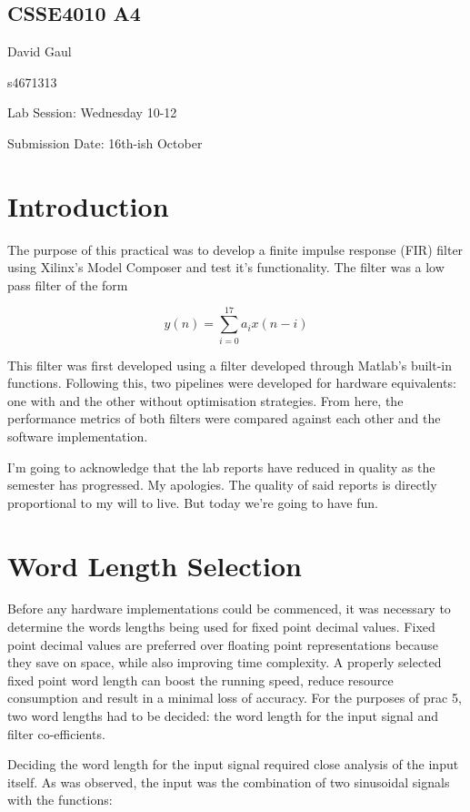 \documentclass[12pt,a4paper]{article}
\begin{document}
\begin{center}
\bigskip
\section*{CSSE4010 A4}
\end{center}

David Gaul

s4671313

Lab Session: Wednesday 10-12

Submission Date: 16th-ish October

\section{Introduction}

The purpose of this practical was to  develop a finite impulse response (FIR) filter using Xilinx's Model Composer and test it's functionality. The filter was a low pass filter of the form

\[y(n) = \sum_{i=0}^{17} a_ix(n-i)\]

This filter was first developed using a filter developed through Matlab's built-in functions. Following this, two pipelines were developed for hardware equivalents: one with and the other without optimisation strategies. From here, the performance metrics of both filters were compared against each other and the software implementation.

I'm going to acknowledge that the lab reports have reduced in quality as the semester has progressed. My apologies. The quality of said reports is directly proportional to my will to live. But today we're going to have fun.

\section{Word Length Selection}

Before any hardware implementations could be commenced, it was necessary to determine the words lengths being used for fixed point decimal values. Fixed point decimal values are preferred over floating point representations because they save on space, while also improving time complexity. A properly selected fixed point word length can boost the running speed, reduce resource consumption and result in a minimal loss of accuracy. For the purposes of prac 5, two word lengths had to  be decided: the word length for the input signal and filter co-efficients.

Deciding the word length for the input signal required close analysis of the input itself. As was observed, the input was the combination of two sinusoidal signals with the functions:
\end{document}
